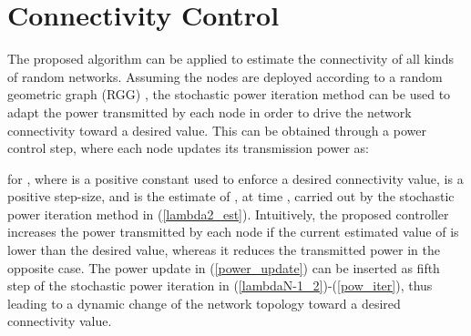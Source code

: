 \documentclass[10pt,twocolumn]{IEEEtran}
\begin{document}
\section{Connectivity Control}

The proposed algorithm can be applied to estimate the connectivity of all kinds of random networks. Assuming the nodes are deployed according to a random geometric graph (RGG) \cite{Penrose}, the stochastic power iteration method can be used to adapt the power transmitted by each node in order to drive the network connectivity toward a desired value. This can be obtained through a power control step, where each node updates its transmission power as:

for , where  is a positive constant used to enforce a desired connectivity value,  is a positive step-size, and  is the estimate of , at time , carried out by the stochastic power iteration method in (\ref{lambda2_est}). Intuitively, the proposed controller increases the power transmitted by each node if the current estimated value of  is lower than the desired value, whereas it reduces the transmitted power in the opposite case.
The power update in (\ref{power_update}) can be inserted as fifth step of the stochastic power iteration in (\ref{lambdaN-1_2})-(\ref{pow_iter}), thus leading to a dynamic change of the network topology toward a desired connectivity value.
\end{document}
